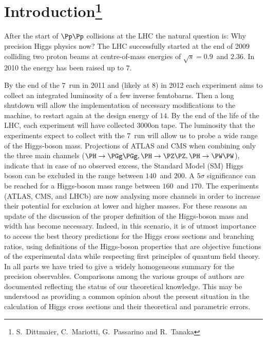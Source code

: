 \section{Introduction\footnote{S.~Dittmaier, C.~Mariotti, G.~Passarino
    and R.~Tanaka}}


After the start of $\Pp\Pp$ collisions at the LHC the natural question is: Why 
precision Higgs physics now? The LHC successfully started at the end of 2009 colliding two proton 
beams at centre-of-mass energies of $\sqrt{s}= 0.9$\UTeV\  
and $2.36$\UTeV. 
In 2010 the energy has been raised up to $7$\UTeV. 

By the end of the $7$\UTeV\ run in 2011 and (likely at $8$\UTeV) in 2012  
each experiment aims to collect an integrated luminosity of a few inverse femtobarns. 
Then a long shutdown will allow the implementation of necessary modifications to 
the machine, to restart again at the design energy of $14$\UTeV. 
By the end of the life of the LHC, each experiment will have collected
$3000$\ifb on tape. 
The luminosity that the experiments expect to collect with the $7$\UTeV\ run 
will allow us to probe a wide range of the Higgs-boson mass. Projections of 
ATLAS and CMS %
when combining only 
the three main channels ($\PH \rightarrow \PGg\PGg, \PH \rightarrow \PZ\PZ,\PH 
\rightarrow \PW\PW$), indicate that in case of no observed excess, the 
Standard Model (SM) Higgs boson can be excluded in the range between
$140$\UGeV\ and $200$\UGeV.
A $5\sigma$ significance can be reached for a Higgs-boson mass range 
between $160$\UGeV\ and $170$\UGeV. 
The experiments (ATLAS, CMS, and LHCb) are now analysing more channels 
in order to increase their potential for exclusion at lower and higher 
masses.
For these reasons an update of the discussion of the proper definition of 
the Higgs-boson mass and width has become necessary.
Indeed, in this scenario, it is of utmost importance to access the best 
theory predictions for the Higgs cross sections and branching ratios,
using definitions of the Higgs-boson properties that are objective 
functions of the experimental data while respecting first principles of 
quantum field theory.
In all parts we have tried to give a widely homogeneous summary for the
precision observables. Comparisons among the various groups of authors
are documented reflecting the status of our theoretical knowledge.
This may be understood as providing a common opinion about the present
situation in the calculation of Higgs cross sections and their theoretical 
and parametric errors.

